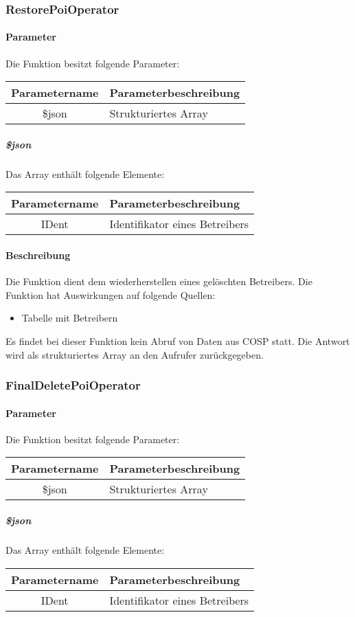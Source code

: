 \subsubsection{RestorePoiOperator}
\paragraph{Parameter} Die Funktion besitzt folgende Parameter:
\begin{table}[H]
	\begin{tabular}{|c|p{11cm}|}
		\hline
		\textbf{Parametername} & \textbf{Parameterbeschreibung} \\ \hline
		\$json & Strukturiertes Array \\ \hline
	\end{tabular}
\end{table}
\subparagraph{\$json}Das Array enthält folgende Elemente:
\begin{table}[H]
	\begin{tabular}{|c|p{11cm}|}
		\hline
		\textbf{Parametername} & \textbf{Parameterbeschreibung} \\ \hline
		IDent & Identifikator eines Betreibers \\ \hline
	\end{tabular}
\end{table}
\paragraph{Beschreibung} Die Funktion dient dem wiederherstellen eines gelöschten Betreibers. Die Funktion hat Auswirkungen auf folgende Quellen:
\begin{itemize}
	\item Tabelle mit Betreibern
\end{itemize}
Es findet bei dieser Funktion kein Abruf von Daten aus {\glqq COSP\grqq} statt. Die Antwort wird als strukturiertes Array an den Aufrufer zurückgegeben.
\subsubsection{FinalDeletePoiOperator}
\paragraph{Parameter} Die Funktion besitzt folgende Parameter:
\begin{table}[H]
	\begin{tabular}{|c|p{11cm}|}
		\hline
		\textbf{Parametername} & \textbf{Parameterbeschreibung} \\ \hline
		\$json & Strukturiertes Array \\ \hline
	\end{tabular}
\end{table}
\subparagraph{\$json}Das Array enthält folgende Elemente:
\begin{table}[H]
	\begin{tabular}{|c|p{11cm}|}
		\hline
		\textbf{Parametername} & \textbf{Parameterbeschreibung} \\ \hline
		IDent & Identifikator eines Betreibers \\ \hline
	\end{tabular}
\end{table}
